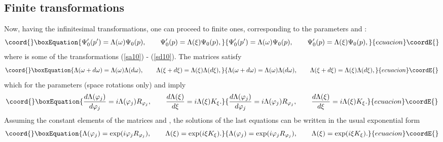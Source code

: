 \documentclass[a4paper,a4paper]{article}
\begin{document}
\subsection{Finite transformations}

Now, having the infinitesimal transformations, one can proceed to finite
ones, corresponding to the parameters \myHighlight{$\omega $}\coordHE{} and \myHighlight{$\xi $}\coordHE{}: 
\begin{equation}\coord{}\boxEquation{
\Psi _{0}^{\prime }(p^{\prime })=\Lambda (\omega )\Psi _{0}(p),\qquad \Psi
_{0}^{\prime }(p)=\Lambda (\xi )\Psi _{0}(p),  \label{s54}
}{
\Psi _{0}^{\prime }(p^{\prime })=\Lambda (\omega )\Psi _{0}(p),\qquad \Psi
_{0}^{\prime }(p)=\Lambda (\xi )\Psi _{0}(p),  }{ecuacion}\coordE{}\end{equation}%
where \coordHE{} is some of the transformations (\ref{sa10})
- (\ref{sd10}). The matrices \myHighlight{$\Lambda $}\coordHE{} satisfy 
\begin{equation}\coord{}\boxEquation{
\Lambda (\omega +d\omega )=\Lambda (\omega )\Lambda (d\omega ),\qquad
\Lambda (\xi +d\xi )=\Lambda (\xi )\Lambda (d\xi ),  \label{s55}
}{
\Lambda (\omega +d\omega )=\Lambda (\omega )\Lambda (d\omega ),\qquad
\Lambda (\xi +d\xi )=\Lambda (\xi )\Lambda (d\xi ),  }{ecuacion}\coordE{}\end{equation}%
which for the parameters \myHighlight{$\varphi $}\coordHE{} (space rotations only) and \myHighlight{$\xi $}\coordHE{} imply 
\begin{equation}\coord{}\boxEquation{
\frac{d\Lambda (\varphi _{j})}{d\varphi _{j}}=i\Lambda (\varphi
_{j})R_{\varphi _{j}},\qquad \frac{d\Lambda (\xi )}{d\xi }=i\Lambda (\xi
)K_{\xi }.  \label{s56}
}{
\frac{d\Lambda (\varphi _{j})}{d\varphi _{j}}=i\Lambda (\varphi
_{j})R_{\varphi _{j}},\qquad \frac{d\Lambda (\xi )}{d\xi }=i\Lambda (\xi
)K_{\xi }.  }{ecuacion}\coordE{}\end{equation}%
Assuming the constant elements of the matrices \coordHE{} and \coordHE{}, the solutions of the last equations can be written in the usual
exponential form 
\begin{equation}\coord{}\boxEquation{
\Lambda (\varphi _{j})=\exp (i\varphi _{j}R_{\varphi _{j}}),\qquad \Lambda
(\xi )=\exp (i\xi K_{\xi }).  \label{s57}
}{
\Lambda (\varphi _{j})=\exp (i\varphi _{j}R_{\varphi _{j}}),\qquad \Lambda
(\xi )=\exp (i\xi K_{\xi }).  }{ecuacion}\coordE{}\end{equation}%
\end{document}
